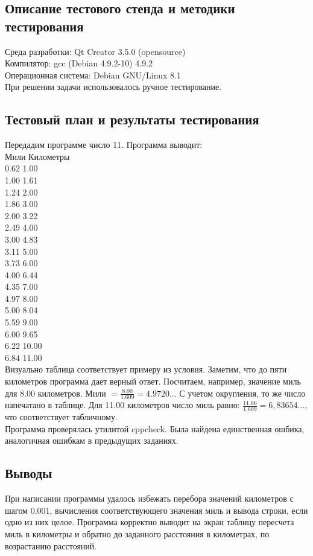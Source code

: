\documentclass[12pt,a4paper]{report}
\begin{document}
\subsection{Описание тестового стенда и методики тестирования}
Среда разработки: Qt Creator 3.5.0 (opensource)\\
Компилятор: gcc (Debian 4.9.2-10) 4.9.2 \\
Операционная система: Debian GNU/Linux 8.1 \\
При решении задачи использовалось ручное тестирование. 
\subsection{Тестовый план и результаты тестирования}
Передадим программе число 11. Программа выводит: \\
Мили Километры\\
0.62 1.00 \\
1.00 1.61 \\
1.24 2.00 \\
1.86 3.00 \\
2.00 3.22 \\
2.49 4.00 \\
3.00 4.83 \\
3.11 5.00 \\
3.73 6.00 \\
4.00 6.44 \\
4.35 7.00 \\
4.97 8.00 \\
5.00 8.04 \\
5.59 9.00 \\
6.00 9.65 \\
6.22 10.00 \\
6.84 11.00 \\
Визуально таблица соответствует примеру из условия. Заметим, что до пяти километров программа дает верный ответ. Посчитаем, например, значение миль для 8.00 километров. Мили $= \frac{8.00}{1.609} = 4.9720...$ С учетом округления, то же число напечатано в таблице. Для 11.00 километров число миль равно: $\frac{11.00}{1.609} = 6,83654...$, что соответствует табличному. \\
Программа проверялась утилитой cppcheck. Была найдена единственная ошбика, аналогичная ошибкам в предыдущих заданиях.
\subsection{Выводы}
При написании программы удалось избежать перебора значений километров с шагом 0.001, вычисления соответствующего значения миль и вывода строки, если одно из них целое. Программа корректно выводит на экран таблицу пересчета миль в километры и обратно до заданного расстояния в километрах, по возрастанию расстояний.
\end{document}

